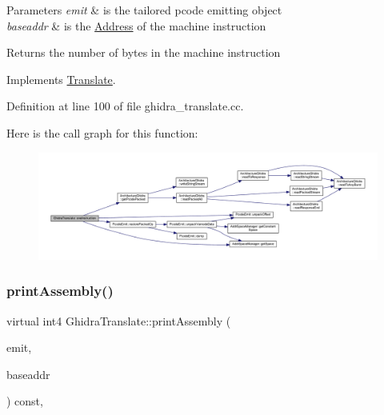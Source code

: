 \begin{DoxyParams}{Parameters}
{\em emit} & is the tailored pcode emitting object \\
\hline
{\em baseaddr} & is the \mbox{\hyperlink{class_address}{Address}} of the machine instruction \\
\hline
\end{DoxyParams}
\begin{DoxyReturn}{Returns}
the number of bytes in the machine instruction 
\end{DoxyReturn}


Implements \mbox{\hyperlink{class_translate_a1737782c38ee43de62ae2e7572321fc9}{Translate}}.



Definition at line 100 of file ghidra\+\_\+translate.\+cc.

Here is the call graph for this function\+:
\nopagebreak
\begin{figure}[H]
\begin{center}
\leavevmode
\includegraphics[width=350pt]{class_ghidra_translate_aa78b3ea805b2fb69c7e4dc9e7d8f32ee_cgraph}
\end{center}
\end{figure}
\mbox{\label{class_ghidra_translate_a363639d53835ddef0fcdbc22641ba685}} 
\subsubsection{\texorpdfstring{printAssembly()}{printAssembly()}}
{\footnotesize\ttfamily virtual int4 Ghidra\+Translate\+::print\+Assembly (\begin{DoxyParamCaption}\item[{\mbox{\hyperlink{class_assembly_emit}{Assembly\+Emit}} \&}]{emit,  }\item[{const \mbox{\hyperlink{class_address}{Address}} \&}]{baseaddr }\end{DoxyParamCaption}) const\hspace{0.3cm}{\ttfamily [inline]}, {\ttfamily [virtual]}}




